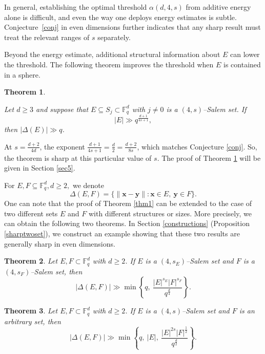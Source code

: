\documentclass[11pt]{article}
\newtheorem{theorem}{Theorem}
\newtheorem{corollary}[theorem]{Corollary}
\begin{document}
In general, establishing the optimal threshold $\alpha(d,4,s)$ from additive energy alone is difficult, and even the way one deploys energy estimates is subtle. Conjecture~\ref{conj} in even dimensions further indicates that any sharp result must treat the relevant ranges of $s$ separately.

Beyond the energy estimate, additional structural information about $E$ can lower the threshold. The following theorem improves the threshold when $E$ is contained in a sphere.

\begin{theorem}\label{thm13}

Let $d \geq 3$ and suppose that $E \subseteq S_j \subset \mathbb{F}_q^d$ with $j \neq 0$ is a $(4,s)$--Salem set. If 
$$|E| \gg q^{\frac{d+1}{4s+1}},$$
then $|\Delta(E)| \gg q$.
\end{theorem}
At $s=\tfrac{d+2}{4d}$, the exponent $\frac{d+1}{4s+1}=\frac{d}{2}=\frac{d+2}{8s}$, which matches Conjecture \ref{conj}. So, the theorem is sharp at this particular value of $s$. The proof of Theorem \ref{thm13} will be given in Section \ref{sec5}.



For $E, F\subseteq \mathbb F_q^d, d\ge 2,$  we denote 
\[\Delta(E, F)=\{\|\mathbf{x}-\mathbf{y}\|\colon \mathbf{x}\in E, ~\mathbf{y}\in F\}.\]  
One can note that  the proof of Theorem \ref{thm1} can be extended to the case of two different sets $E$ and $F$ with different structures or sizes. 
More precisely, we can obtain the following two theorems.  In  Section \ref{constructions} (Proposition \ref{sharptwoset}), we construct an example showing that these two results are generally sharp in even dimensions. 

\begin{theorem}\label{ex2}
 Let $E, F\subset \mathbb{F}_q^d$ with $d\ge 2$. If $E$ is a $(4, s_E)$--Salem set and $F$ is a $(4, s_F)$--Salem set, then  
   \[|\Delta(E, F)|\gg \min \left\lbrace q,~ \frac{|E|^{s_E}|F|^{s_F}}{q^{\frac{d}{4}}} \right\rbrace.\]
\end{theorem}
\begin{theorem}\label{ex1}
    Let $E, F\subset \mathbb{F}_q^d$ with $d\ge 2$. If $E$ is a $(4, s)$--Salem set and $F$ is an arbitrary set, then 
    \[|\Delta(E, F)|\gg \min \left\lbrace q,~|E|, ~\frac{|E|^{2s}|F|^{\frac{1}{2}}}{q^{\frac{d}{2}}} \right\rbrace.\]
\end{theorem}
\end{document}
